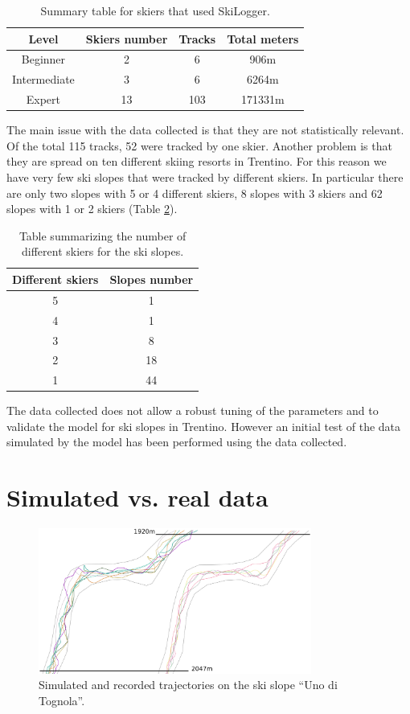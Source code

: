 \documentclass[12pt,a4paper,twoside]{book}
\begin{document}
\begin{table}[!h]
  \centering
  \begin{tabular}{ | c | c | c | c | }
    \hline
    Level & Skiers number & Tracks & Total meters \\
    \hline
    Beginner & 2  & 6 & 906m \\
    Intermediate & 3 & 6 & 6264m \\
    Expert & 13 & 103 & 171331m \\
    \hline
  \end{tabular}
  \caption{Summary table for skiers that used SkiLogger.}
  \label{skiers}
\end{table}

The main issue with the data collected is that they are not statistically relevant. Of the total 115 tracks, 52 were tracked by one skier. Another problem is that they are spread on ten different skiing resorts in Trentino. For this reason we have very few ski slopes that were tracked by different skiers. In particular there are only two slopes with 5 or 4 different skiers, 8 slopes with 3 skiers and 62 slopes with 1 or 2 skiers (Table \ref{slopes}).

\begin{table}[!h]
  \centering
  \begin{tabular}{ | c | c | }
    \hline
    Different skiers & Slopes number \\
    \hline
    5 & 1 \\
    4 & 1 \\
    3 & 8 \\
    2 & 18 \\
    1 & 44 \\
    \hline
  \end{tabular}
  \caption{Table summarizing the number of different skiers for the ski slopes.}
  \label{slopes}
\end{table}

The data collected does not allow a robust tuning of the parameters and to validate the model for ski slopes in Trentino. However an initial test of the data simulated by the model has been performed using the data collected.

\section{Simulated vs. real data}
\begin{figure}[!h]
  \centering
    \includegraphics[width=0.8\textwidth]{images/traiettorie.eps}
    \caption{Simulated and recorded trajectories on the ski slope ``Uno di Tognola''.}\label{traj}
\end{figure}
\end{document}
